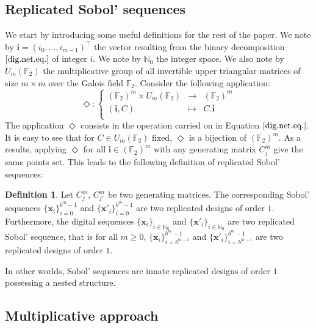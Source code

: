 \documentclass[]{elsarticle}
\theoremstyle{definition}
\newtheorem{defin}{Definition}
\newcommand{\bvec}[1]{\boldsymbol{#1}}
\newcommand{\vx}{\bvec{x}}
\newcommand{\vi}{\bvec{i}}
\begin{document}
\subsection{Replicated Sobol' sequences}


We start by introducing some useful definitions for the rest of the paper. We note by $\vi=(i_{0},\dots,i_{m-1})^\intercal$ the vector resulting from the binary decomposition $\eqref{dig.net.eq.}$ of integer $i$. We note by $\mathbb{N}_0$ the integer space. We also note by $U_m(\mathbb{F}_2)$ the multiplicative group of all invertible upper triangular matrices of size $m\times m$ over the Galois field $\mathbb{F}_2$. Consider the following application:
\begin{equation*}
 \Diamond \colon \left\lbrace \begin{array}{ccccc} (\mathbb{F}_2)^m \times U_m(\mathbb{F}_2) & \to & (\mathbb{F}_2)^m \\
  (\vi,C) & \mapsto &  C . \vi \\
\end{array} \right.
\end{equation*}
The application $\Diamond$ consists in the operation carried on in Equation $\eqref{dig.net.eq.}$. It is easy to see that for $C \in U_m(\mathbb{F}_2)$ fixed, $\Diamond$ is a bijection of $(\mathbb{F}_2)^m$. As a results, applying $\Diamond$ for all $\vi \in (\mathbb{F}_2)^m$ with any generating matrix $C_j^m$ give the same points set. This leads to the following definition of replicated Sobol' sequences:
\begin{defin}
Let $C_j^m$, $C_{j'}^m$ be two generating matrices. The corresponding Sobol' sequences $\{\vx_i\}_{i=0}^{b^m-1}$ and $\{\vx'_i\}_{i=0}^{b^m-1}$ are two replicated designs of order $1$. Furthermore, the digital sequences $\{{\vx}_i\}_{i\in\mathbb{N}_0}$ and $\{{\vx'}_i\}_{i\in\mathbb{N}_0}$ are two replicated Sobol' sequence, that is for all $m \geq 0$, $\{{\vx}_i\}_{i=b^{m-1}}^{b^m-1}$ and $\{{\vx'}_i\}_{i=b^{m-1}}^{b^m-1}$ are two replicated designs of order $1$.
\end{defin}
In other worlds, Sobol' sequences are innate replicated designs of order $1$ possessing a nested structure.


\subsection{Multiplicative approach}
%
\end{document}
